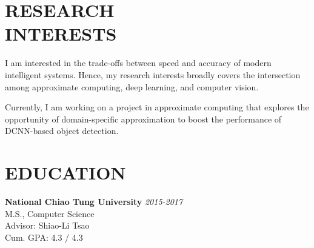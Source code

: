 \documentclass[margin, 9pt]{res} %
\begin{document}
\begin{resume}


\vspace*{-5pt}
\section{RESEARCH\\ INTERESTS}

I am interested in the trade-offs between speed and accuracy of modern
intelligent systems. Hence, my research interests broadly covers the
intersection among approximate computing, deep learning, and computer vision.

Currently, I am working on a project in approximate computing that explores the
opportunity of domain-specific approximation to boost the performance of
DCNN-based object detection.



\section{EDUCATION}


\textbf{National Chiao Tung University} \hfill\textit{2015-2017}\\
M.S., Computer Science\\
Advisor: Shiao-Li Tsao\\
Cum. GPA: 4.3 / 4.3\\


\end{resume}
\end{document}
